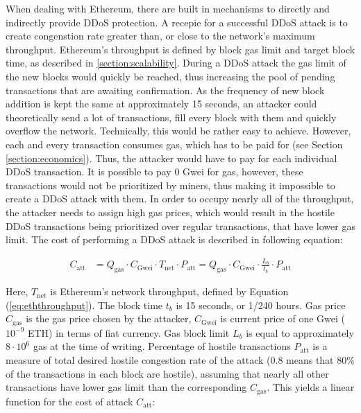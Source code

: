 When dealing with Ethereum, there are built in mechanisms to directly and indirectly provide DDoS protection. A recepie for a successful DDoS attack is to create congenstion rate greater than, or close to the network's maximum throughput. Ethereum's throughput is defined by block gas limit and target block time, as described in \ref{section:scalability}. During a DDoS attack the gas limit of the new blocks would quickly be reached, thus increasing the pool of pending transactions that are awaiting confirmation. As the frequency of new block addition is kept the same at approximately 15 seconds, an attacker could theoretically send a lot of transactions, fill every block with them and quickly overflow the network. Technically, this would be rather easy to achieve. However, each and every transaction consumes gas, which has to be paid for (see Section \ref{section:economics}). Thus, the attacker would have to pay for each individual DDoS transaction. It is possible to pay 0 Gwei for gas, however, these transactions would not be prioritized by miners, thus making it impossible to create a DDoS attack with them. In order to occupy nearly all of the throughput, the attacker needs to assign high gas prices, which would result in the hostile DDoS transactions being prioritized over regular transactions, that have lower gas limit. The cost of performing a DDoS attack is described in following equation:

\begin{align}
C_{\mathrm{att}} &= Q_{\mathrm{gas}}  \cdot C_{\mathrm{Gwei}} \cdot T_{\mathrm{net}} \cdot P_{\mathrm{att}} = Q_{\mathrm{gas}}  \cdot C_{\mathrm{Gwei}} \cdot \frac{L_b}{t_b} \cdot P_{\mathrm{att}}
\end{align}

Here, $T_{\mathrm{net}}$ is Ethereum's network throughput, defined by Equation (\ref{eq:eththroughput}). The block time $t_b$ is 15 seconds, or 1/240 hours. Gas price $C_{\mathrm{gas}}$ is the gas price chosen by the attacker, $C_{\mathrm{Gwei}}$ is current price of one Gwei ($10^{-9}$ ETH) in terms of fiat currency. Gas block limit $L_{b}$ is equal to approximately $8 \cdot 10^6$ gas at the time of writing. Percentage of hostile transactions $P_{\mathrm{att}}$ is a measure of total desired hostile congestion rate of the attack (0.8 means that 80\% of the transactions in each block are hostile), assuming that nearly all other transactions have lower gas limit than the corresponding $C_{\mathrm{gas}}$. This yields a linear function for the cost of attack $C_{\mathrm{att}}$:

